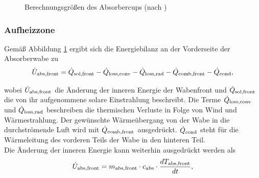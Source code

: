 \begin{figure}[h!]
    \centering
    \setlength{\fboxsep}{1pt}
    \setlength{\fboxrule}{1pt}
    \caption[Berechnungsgrößen des Absorbercups]{Berechnungsgrößen des Absorbercups (nach \cite{IdingSolarPaces})}
    \label{fig_AbsorberBerechnung}
\end{figure}

\subsubsection*{Aufheizzone} \label{subsubsec_EnergiebilanzAufheizzone}
Gemäß Abbildung \ref{fig_AbsorberBerechnung} ergibt sich die Energiebilanz an der Vorderseite der Absorberwabe zu
\begin{equation} \label{eq_EnergiebilanzWabe}
\dot{U}_{\mathrm{abs}, \mathrm{front}} =\dot{Q}_{\mathrm{sol,front}} - \dot{Q}_{\mathrm{loss,conv}} -  \dot{Q}_{\mathrm{loss,rad}} -\dot{Q}_{\mathrm{comb,front}} - \dot{Q}_{\mathrm{cond}},
\end{equation}

\vspace*{-\baselineskip}wobei $\dot{U}_{\mathrm{abs}, \mathrm{front}}$ die Änderung der inneren Energie der Wabenfront und $\dot{Q}_{\mathrm{sol,front}}$ die von ihr aufgenommene solare Einstrahlung beschreibt.
Die Terme $\dot{Q}_{\mathrm{loss,conv}}$ und $\dot{Q}_{\mathrm{loss,rad}}$ beschreiben die thermischen Verluste in Folge von Wind und Wärmestrahlung.
Der gewünschte Wärmeübergang von der Wabe in die durchströmende Luft wird mit $\dot{Q}_{\mathrm{comb,front}}$ ausgedrückt.
$\dot{Q}_{\mathrm{cond}}$ steht für die Wärmeleitung des vorderen Teils der Wabe in den hinteren Teil.\\
Die Änderung der inneren Energie kann weiterhin ausgedrückt werden als
\begin{equation} \label{eq_InnereEnergie}
\dot{U}_{\mathrm{abs}, \mathrm{front}} = m_{\mathrm{abs,front}} \cdot c_{\mathrm{abs}} \cdot \frac{d T_{\mathrm{abs,front}}}{d t},
\end{equation}

